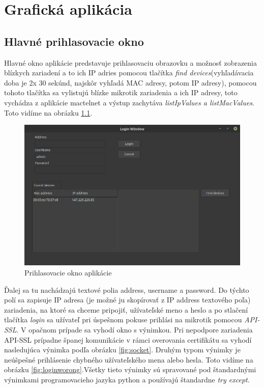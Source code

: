 \chapter{Grafická aplikácia}
\section{Hlavné prihlasovacie okno}
Hlavné okno aplikácie predstavuje prihlasovaciu obrazovku a možnosť zobrazenia blízkych zariadení a to ich IP adries pomocou tlačítka \textit{find devices}(vyhľadávacia doba je 2x 30 sekúnd, najskôr vyhľadá MAC adresy, potom IP adresy), pomocou tohoto tlačítka sa vylistujú blízke mikrotik zariadenia a ich IP adresy, toto vychádza z aplikácie mactelnet a výstup zachytáva \textit{listIpValues a listMacValues}. Toto vidíme na obrázku \ref{fig:winboxlinux}.
\begin{figure}[H]
\centering
\includegraphics[scale=0.45]{../text/winboxnew.png}
\caption{Prihlasovacie okno aplikácie}
\label{fig:winboxlinux}
\end{figure}
Ďalej sa tu nachádzajú textové polia address, username a password. Do týchto polí sa zapisuje IP adresa (je možné ju skopírovať z IP address textového poľa) zariadenia, na ktoré sa chceme pripojiť, užívateľské meno  a heslo a po stlačení tlačítka \textit{login} sa užívateľ pri úspešnom pokuse prihlási na mikrotik pomocou \textit{API-SSL}. V opačnom prípade sa vyhodí okno s výnimkou. Pri nepodpore zariadenia API-SSL prípadne španej komunikácie v rámci overovania certifikátu sa vyhodí nasledujúca výnimka podľa obrázku \ref{fig:socket}. Druhým typom výnimky je neúšpešné prihlásenie chybného užívateľského mena alebo hesla. Toto vidíme na obrázku \ref{fig:loginworong}.Všetky tieto výnimky sú spravované pod štandardnými výnimkami programovacieho jazyka python a používajú štandardne \textit{try except}.
